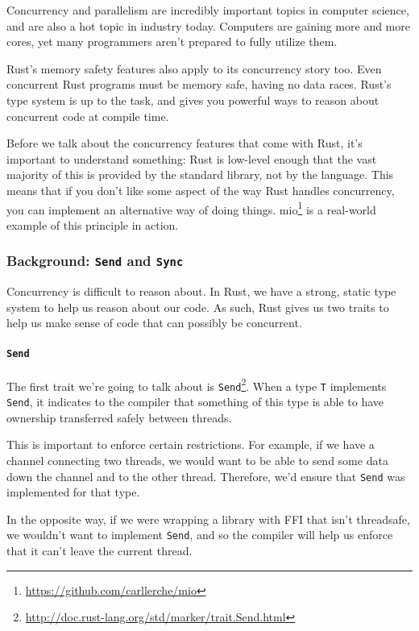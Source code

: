 \documentclass[a4paper,]{book}
\renewcommand{\href}[2]{#2\footnote{\url{#1}}}
\let\oldparagraph\paragraph
\renewcommand{\paragraph}[1]{\oldparagraph{#1}\mbox{}}
\begin{document}
Concurrency and parallelism are incredibly important topics in computer
science, and are also a hot topic in industry today. Computers are
gaining more and more cores, yet many programmers aren't prepared to
fully utilize them.

Rust's memory safety features also apply to its concurrency story too.
Even concurrent Rust programs must be memory safe, having no data races.
Rust's type system is up to the task, and gives you powerful ways to
reason about concurrent code at compile time.

Before we talk about the concurrency features that come with Rust, it's
important to understand something: Rust is low-level enough that the
vast majority of this is provided by the standard library, not by the
language. This means that if you don't like some aspect of the way Rust
handles concurrency, you can implement an alternative way of doing
things. \href{https://github.com/carllerche/mio}{mio} is a real-world
example of this principle in action.

\subsubsection{\texorpdfstring{Background: \texttt{Send} and
\texttt{Sync}}{Background: Send and Sync}}\label{background-send-and-sync}

Concurrency is difficult to reason about. In Rust, we have a strong,
static type system to help us reason about our code. As such, Rust gives
us two traits to help us make sense of code that can possibly be
concurrent.

\paragraph{\texorpdfstring{\texttt{Send}}{Send}}\label{send}

The first trait we're going to talk about is
\href{http://doc.rust-lang.org/std/marker/trait.Send.html}{\texttt{Send}}.
When a type \texttt{T} implements \texttt{Send}, it indicates to the
compiler that something of this type is able to have ownership
transferred safely between threads.

This is important to enforce certain restrictions. For example, if we
have a channel connecting two threads, we would want to be able to send
some data down the channel and to the other thread. Therefore, we'd
ensure that \texttt{Send} was implemented for that type.

In the opposite way, if we were wrapping a library with FFI that isn't
threadsafe, we wouldn't want to implement \texttt{Send}, and so the
compiler will help us enforce that it can't leave the current thread.
\end{document}
